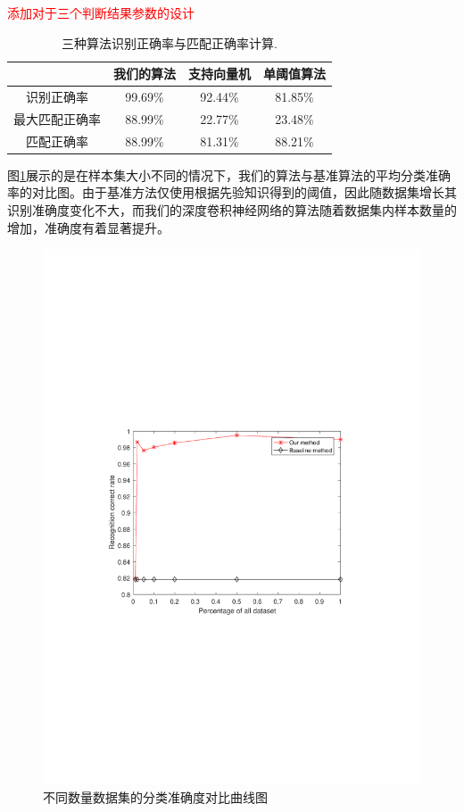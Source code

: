 \textcolor{red}{添加对于三个判断结果参数的设计}
\begin{table}[!t]
	\renewcommand{\arraystretch}{1.3}
	\caption{三种算法识别正确率与匹配正确率计算.}
	\label{tab:methods}
	\centering
	\begin{tabular}{c|ccc}
		\hline
		& 我们的算法 & 支持向量机 & 单阈值算法 \\
		\hline
		识别正确率 & 99.69\% & 92.44\% & 81.85\% \\
		\hline
		最大匹配正确率 & 88.99\% & 22.77\% & 23.48\% \\
		\hline
		匹配正确率 & 88.99\% & 81.31\% & 88.21\% \\
		\hline
	\end{tabular}
\end{table}

图\ref{fig:sizes}展示的是在样本集大小不同的情况下，我们的算法与基准算法的平均分类准确率的对比图。由于基准方法仅使用根据先验知识得到的阈值，因此随数据集增长其识别准确度变化不大，而我们的深度卷积神经网络的算法随着数据集内样本数量的增加，准确度有着显著提升。
\begin{figure}[!t]
	\centering
	\includegraphics[width=\textwidth]{figures/sizes}
	\caption{不同数量数据集的分类准确度对比曲线图}
	\label{fig:sizes}
\end{figure}

